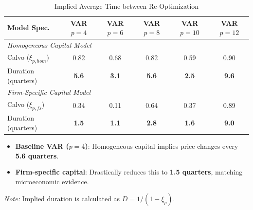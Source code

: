 \begin{table}[htpb]
    \centering
    \small
    \renewcommand{\arraystretch}{1.2}
    \caption{Implied Average Time between Re-Optimization}
    \label{tab:implied_duration_all_lags}
    \begin{tabular}{lccccc}
        \toprule
        \textbf{Model Spec.} & \textbf{VAR $p=4$} & \textbf{VAR $p=6$} & \textbf{VAR $p=8$} & \textbf{VAR $p=10$} & \textbf{VAR $p=12$} \\
        \midrule

        \multicolumn{6}{l}{\textit{Homogeneous Capital Model}} \\
        Calvo ($\xi_{p, hom}$) & 0.82 & 0.68 & 0.82 & 0.59 & 0.90 \\
        Duration (quarters)     & \textbf{5.6} & \textbf{3.1} & \textbf{5.6} & \textbf{2.5} & \textbf{9.6} \\

        \midrule
        \multicolumn{6}{l}{\textit{Firm-Specific Capital Model}} \\
        Calvo ($\xi_{p, fs}$) & 0.34 & 0.11 & 0.64 & 0.37 & 0.89 \\
        Duration (quarters)    & \textbf{1.5} & \textbf{1.1} & \textbf{2.8} & \textbf{1.6} & \textbf{9.0} \\

        \bottomrule
    \end{tabular}

    \vspace{0.2cm}
    \begin{itemize}
        \item \textbf{Baseline VAR ($p=4$)}: Homogeneous capital implies price changes every \textbf{5.6 quarters}.
        \item \textbf{Firm-specific capital}: Drastically reduces this to \textbf{1.5 quarters}, matching microeconomic evidence.
    \end{itemize}

    \vspace{0.2cm}
    \raggedright
    \scriptsize{\textit{Note:} Implied duration is calculated as $D = 1/(1 - \xi_p)$.}
\end{table}
